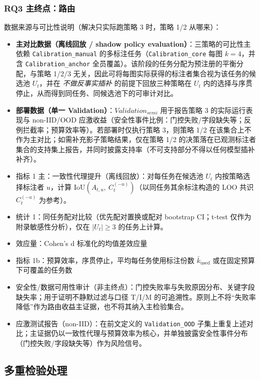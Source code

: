 \subsubsection{RQ3 主终点：路由}
\noindent 数据来源与可比性说明（解决只实际跑策略 3 时，策略 1/2 从哪来）：
\begin{itemize}
    \item \textbf{主对比数据（离线回放 / shadow policy evaluation）}：三策略的可比性主依赖 \texttt{Calibration\_manual} 的多标注任务（\texttt{Calibration\_core} 每图 $k=4$，并含 \texttt{Calibration\_anchor} 全员覆盖）。该阶段的任务分配为预注册的平衡分配，与策略 1/2/3 无关，因此可将每图实际获得的标注者集合视为该任务的候选池 $U_t$，并在 \emph{不做反事实插补} 的前提下回放三种策略在 $U_t$ 内的选择与序贯停止，从而得到同任务、同候选池下的可审计对比。
    \item \textbf{部署数据（单一 Validation）}：$Validation_{semi}$ 用于报告策略 3 的实际运行表现与 non-IID/OOD 应激收益（安全性事件比例：门控失败/字段缺失等；反例拦截率；预算效率等）。若部署时仅执行策略 3，则策略 1/2 在该集合上不作为主对比；如需补充影子策略结果，仅在策略 1/2 的决策落在已观测标注者集合的支持集上报告，并同时披露支持率（不可支持部分不得以任何模型插补补齐）。
\end{itemize}
\begin{itemize}
    \item 指标 1 主：一致性代理提升（离线回放）：对每任务在候选池 $U_t$ 内按策略选择标注者 $u$，计算 $\mathrm{IoU}\left(A_{t,u},\ C_t^{(-u)}\right)$（以同任务其余标注构造的 LOO 共识 $C_t^{(-u)}$ 为参考）。
    \item 统计 1：同任务配对比较（优先配对置换或配对 bootstrap CI；t-test 仅作为附录敏感性分析），仅在 $\left|U_t\right|\geq3$ 的任务上计算。
    \item 效应量：Cohen's d 标准化的均值差效应量
    \item 指标 1b：预算效率，序贯停止，平均每任务使用标注份数 $\bar{k}_{\mathrm{used}}$ 或在固定预算下可覆盖的任务数
    \item 安全性/数据可用性审计（非主终点）：门控失败率与失败原因分布、关键字段缺失率；用于证明不静默过滤与口径 T/I/M 的可追溯性。原则上不将“失败率降低”作为路由收益主证据，也不将其纳入主检验集合。
    \item 应激测试报告（non-IID）：在前文定义的 \texttt{Validation\_OOD} 子集上重复上述对比；主证据仍以一致性代理与预算效率为核心，并单独披露安全性事件分布（门控失败/字段缺失等）作为风险信号。
\end{itemize}
\subsection{多重检验处理}


